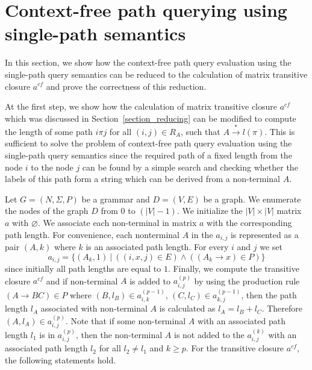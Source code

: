 \section{Context-free path querying using single-path semantics}
In this section, we show how the context-free path query evaluation using the single-path query semantics can be reduced to the calculation of matrix transitive closure $a^{cf}$ and prove the correctness of this reduction.

At the first step, we show how the calculation of matrix transitive closure $a^{cf}$ which was discussed in Section~\ref{section_reducing} can be modified to compute the length of some path $i \pi j$ for all $(i,j) \in R_A$, such that $A \xrightarrow{*} l(\pi)$. This is sufficient to solve the problem of context-free path query evaluation using the single-path query semantics since the required path of a fixed length from the node $i$ to the node $j$ can be found by a simple search and checking whether the labels of this path form a string which can be derived from a non-terminal $A$.

Let $G = (N,\Sigma,P)$ be a grammar and $D = (V, E)$ be a graph. We enumerate the nodes of the graph $D$ from 0 to $(|V| - 1)$. We initialize the $|V| \times |V|$ matrix $a$ with $\varnothing$. We associate each non-terminal in matrix $a$ with the corresponding path length. For convenience, each nonterminal $A$ in the $a_{i,j}$ is represented as a pair $(A,k)$ where $k$ is an associated path length. For every $i$ and $j$ we set $$a_{i,j} = \{(A_k,1)~|~((i,x,j) \in E) \wedge ((A_k \rightarrow x) \in P)\}$$ since initially all path lengths are equal to $1$. Finally, we compute the transitive closure $a^{cf}$ and if non-terminal $A$ is added to $a^{(p)}_{i,j}$ by using the production rule $(A \rightarrow B C) \in P$ where $(B,l_B) \in a^{(p-1)}_{i,k}$, $(C,l_C) \in a^{(p-1)}_{k,j}$, then the path length $l_A$ associated with non-terminal $A$ is calculated as $l_A = l_B + l_C$. Therefore $(A, l_A) \in a^{(p)}_{i,j}$. Note that if some non-terminal $A$ with an associated path length $l_1$ is in $a^{(p)}_{i,j}$, then the non-terminal $A$ is not added to the $a^{(k)}_{i,j}$ with an associated path length $l_2$ for all $l_2 \neq l_1$ and $k \geq p$. For the transitive closure $a^{cf}$, the following statements hold.

